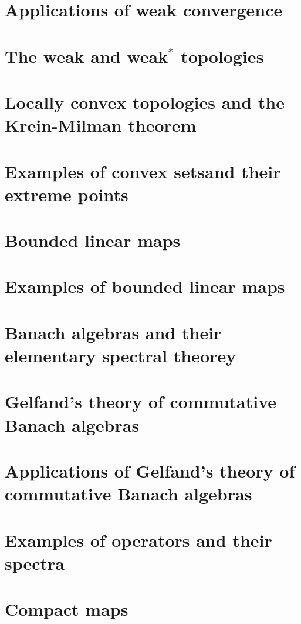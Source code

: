 \documentclass[11pt]{elegantbook}
\begin{document}
\chapter{Applications of weak convergence}

\chapter{The weak and weak$^\ast$ topologies}

\chapter{Locally convex topologies and the Krein-Milman theorem}

\chapter{Examples of convex setsand their extreme points}

\chapter{Bounded linear maps}

\chapter{Examples of bounded linear maps}

\chapter{Banach algebras and their elementary spectral theorey}

\chapter{Gelfand's theory of commutative Banach algebras}

\chapter{Applications of Gelfand's theory of commutative Banach algebras}

\chapter{Examples of operators and their spectra}

\chapter{Compact maps}
\end{document}
